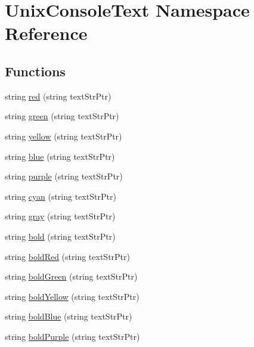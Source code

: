 \hypertarget{namespace_unix_console_text}{\section{Unix\-Console\-Text Namespace Reference}
\label{namespace_unix_console_text}
}
\subsection*{Functions}
\begin{DoxyCompactItemize}
\item 
string \hyperlink{namespace_unix_console_text_a840fb7bb43bbc1f678cd62fd2b2c4fc4}{red} (string text\-Str\-Ptr)
\item 
string \hyperlink{namespace_unix_console_text_ab2c2e29e985fa54da5ed04dec3398a13}{green} (string text\-Str\-Ptr)
\item 
string \hyperlink{namespace_unix_console_text_a9960d6d3528ecd47643f77f47df378f7}{yellow} (string text\-Str\-Ptr)
\item 
string \hyperlink{namespace_unix_console_text_a96190f73e8487955407248e2b8470f92}{blue} (string text\-Str\-Ptr)
\item 
string \hyperlink{namespace_unix_console_text_aedd74e84c105ebb0a4eb899faf220375}{purple} (string text\-Str\-Ptr)
\item 
string \hyperlink{namespace_unix_console_text_a50dbc6f26051f8b6a7e5b8583f5a1a5b}{cyan} (string text\-Str\-Ptr)
\item 
string \hyperlink{namespace_unix_console_text_a9fda6f98552df11063c37291d1dc07c7}{gray} (string text\-Str\-Ptr)
\item 
string \hyperlink{namespace_unix_console_text_a4e2f758c762151766ae2f37290972286}{bold} (string text\-Str\-Ptr)
\item 
string \hyperlink{namespace_unix_console_text_a56df2db5c016133e11066bb0daca969e}{bold\-Red} (string text\-Str\-Ptr)
\item 
string \hyperlink{namespace_unix_console_text_a97f46978463104acd7a185cf93b69e62}{bold\-Green} (string text\-Str\-Ptr)
\item 
string \hyperlink{namespace_unix_console_text_a35dec456c059373291ad5ba17684ef24}{bold\-Yellow} (string text\-Str\-Ptr)
\item 
string \hyperlink{namespace_unix_console_text_abc5a8826d62a0fb1c311b67b20ba87e8}{bold\-Blue} (string text\-Str\-Ptr)
\item 
string \hyperlink{namespace_unix_console_text_af1c5d469cd0c7f073d19d0a2c0087d00}{bold\-Purple} (string text\-Str\-Ptr)

\end{DoxyCompactItemize}
